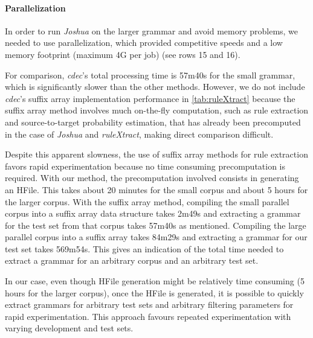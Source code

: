 \paragraph{Parallelization} In order to run \emph{Joshua} on the larger grammar and
    avoid memory problems, we needed to use parallelization, which provided
    competitive speeds and a low memory footprint (maximum 4G per job) (see rows
    15 and 16).

For comparison, \emph{cdec}'s total processing time is 57m40s for the small
grammar, which is significantly slower than the other methods. However, we do
not include \emph{cdec}'s suffix array implementation performance in
\autoref{tab:ruleXtract}
because the suffix array method involves much on-the-fly computation, such
as rule extraction and source-to-target probability estimation, that has
already been precomputed in the case of \emph{Joshua} and \emph{ruleXtract},
making direct comparison difficult.

Despite this apparent slowness, the use of suffix array methods for rule extraction
favors rapid experimentation because no time consuming precomputation is required.
With our method, the precomputation involved consists in generating an HFile.
This takes about 20 minutes for the small corpus and about 5 hours for the larger
corpus. With the suffix array method,
compiling the small parallel corpus into a suffix array
data structure takes 2m49s and extracting a grammar for the test set from
that corpus takes 57m40s as mentioned. Compiling the large parallel corpus
into a suffix array takes 84m29s and extracting a grammar for our test set
takes 569m54s. This gives an indication of the total
time needed to extract a grammar for an arbitrary corpus and an arbitrary test
set.


In our case, even though HFile generation might be relatively
time consuming (5 hours for the larger corpus), once
the HFile is generated, it is possible to quickly extract grammars
for arbitrary test sets and arbitrary filtering parameters for rapid
experimentation. This approach favours repeated experimentation
with varying development and test sets.

